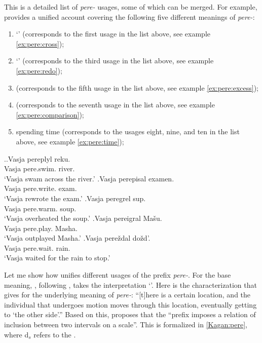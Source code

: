 This is a detailed list of \textit{pere-} usages, some of which can be merged. For example, \citet[119--125]{Kagan:book} provides a unified account covering the following five different meanings of \textit{pere-}: 
\begin{enumerate}
\item `' (corresponds to the first usage in the list above, see example \ref{ex:pere:cross});
\item `' (corresponds to the third usage in the list above, see example \ref{ex:pere:redo});
\item {} (corresponds to the fifth usage in the list above, see example \ref{ex:pere:excess});
\item {} (corresponds to the seventh usage in the list above, see example \ref{ex:pere:comparison});
\item spending time (corresponds to the usages eight, nine, and ten in the list above, see example \ref{ex:pere:time});
\end{enumerate}

\ex.\label{ex:pere}\ag.\label{ex:pere:cross}Vasja pereplyl reku.\\
Vasja pere.swim. river.\\
\trans `Vasja swam across the river.'
\bg.\label{ex:pere:redo}Vasja perepisal examen.\\
Vasja pere.write. exam.\\
\trans `Vasja rewrote the exam.'
\bg.\label{ex:pere:excess}Vasja peregrel sup.\\
Vasja pere.warm. soup.\\
\trans `Vasja overheated the soup.'
\bg.\label{ex:pere:comparison}Vasja pereigral Ma\v{s}u.\\
Vasja pere.play. Masha.\\
\trans `Vasja outplayed Masha.'
\bg.\label{ex:pere:time}Vasja pere\v{z}dal do\v{z}d'.\\
Vasja pere.wait. rain.\\
\trans `Vasja waited for the rain to stop.'

Let me show how \citet{Kagan:book} unifies different usages of the prefix \textit{pere-}. For the base meaning, \citet[120--121]{Kagan:book}, following \citet{Janda:88}, takes the  interpretation `'. Here is the characterization that \citet[121]{Kagan:book} gives for the underlying meaning of \textit{pere-}: ``[t]here is a certain  location, and the individual that undergoes motion moves through this location, eventually getting to `the other side'.'' Based on this, \citet[122]{Kagan:book} proposes that the ``prefix imposes a relation of inclusion between two intervals on a scale''. This is formalized in \ref{Kagan:pere}, where d$_s$ refers to the  .

